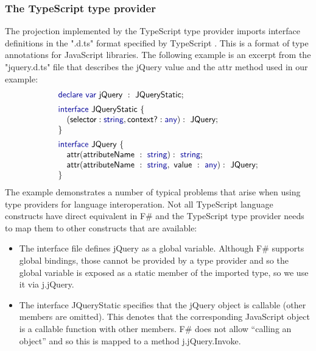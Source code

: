 \documentclass[submission,copyright,creativecommons]{eptcs}
\newcommand{\kvd}[1]{\textnormal{\textcolor{kvdclr}{\sffamily #1}}}
\newcommand{\str}[1]{\textnormal{\textcolor{strclr}{\ttfamily "#1"}}}
\newcommand{\ident}[1]{\textnormal{\sffamily #1}}
\begin{document}
\subsubsection{The TypeScript type provider}
The projection implemented by the TypeScript type provider imports interface definitions in the
\str{.d.ts} format specified by TypeScript \cite{ms-typescript}. This is a format of type
annotations for JavaScript libraries. The following example is an excerpt from the \str{jquery.d.ts}
file that describes the \ident{jQuery} value and the \ident{attr} method used in our example:
%
\begin{equation*}
\begin{array}{l}
 \kvd{declare var}~\ident{jQuery}~:~\ident{JQueryStatic};
\\[0.5em]
 \kvd{interface}~\ident{JQueryStatic}~\{ \\
 \quad (\ident{selector}: \kvd{string}, \ident{context?}: \kvd{any}):~\ident{JQuery}; \\
\}
\\[0.5em]
\kvd{interface}~\ident{JQuery}~\{ \\
\quad \ident{attr}(\ident{attributeName}~:~\kvd{string}):~\kvd{string}; \\
\quad \ident{attr}(\ident{attributeName}~:~\kvd{string},~\ident{value}~:~\kvd{any}):~\ident{JQuery}; \\
\}
\end{array}
\end{equation*}
%
The example demonstrates a number of typical problems that arise when using type providers for
language interoperation. Not all TypeScript language constructs have direct equivalent in F\# and
the TypeScript type provider needs to map them to other constructs that are available:
%
\begin{itemize}
\item The interface file defines \ident{jQuery} as a global variable. Although F\# supports
  global bindings, those cannot be provided by a type provider and so the global variable
  is exposed as a static member of the imported type, so we use it via \ident{j.jQuery}.

\item The interface \ident{JQueryStatic} specifies that the \ident{jQuery} object is callable
  (other members are omitted). This denotes that the corresponding JavaScript object is a
  callable function with other members. F\# does not allow ``calling an object'' and so
  this is mapped to a method \ident{j.jQuery.Invoke}.
\end{itemize}
\end{document}
